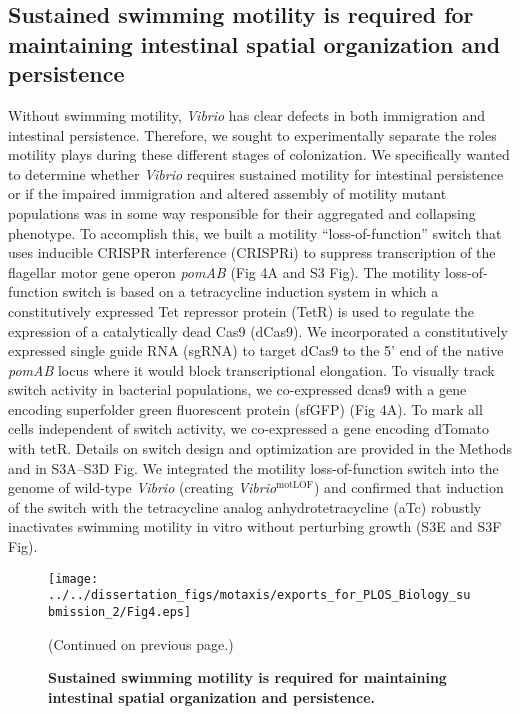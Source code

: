 {{{\subsection{Sustained swimming motility is required for maintaining intestinal spatial organization and persistence}  
Without swimming motility, \textit{Vibrio} has clear defects in both immigration and intestinal persistence. Therefore, we sought to experimentally separate the roles motility plays during these different stages of colonization. We specifically wanted to determine whether \textit{Vibrio} requires sustained motility for intestinal persistence or if the impaired immigration and altered assembly of motility mutant populations was in some way responsible for their aggregated and collapsing phenotype. To accomplish this, we built a motility ``loss-of-function'' switch that uses inducible CRISPR interference (CRISPRi) to suppress transcription of the flagellar motor gene operon \textit{pomAB} (Fig 4A and S3 Fig). The motility loss-of-function switch is based on a tetracycline induction system in which a constitutively expressed Tet repressor protein (TetR) is used to regulate the expression of a catalytically dead Cas9 (dCas9). We incorporated a constitutively expressed single guide RNA (sgRNA) to target dCas9 to the 5' end of the native \textit{pomAB} locus where it would block transcriptional elongation. To visually track switch activity in bacterial populations, we co-expressed dcas9 with a gene encoding superfolder green fluorescent protein (sfGFP) (Fig 4A). To mark all cells independent of switch activity, we co-expressed a gene encoding dTomato with tetR. Details on switch design and optimization are provided in the Methods and in S3A–S3D Fig. We integrated the motility loss-of-function switch into the genome of wild-type \textit{Vibrio} (creating \textit{Vibrio}$^{\text{motLOF}}$) and confirmed that induction of the switch with the tetracycline analog anhydrotetracycline (aTc) robustly inactivates swimming motility in vitro without perturbing growth (S3E and S3F Fig).  

\begin{figure}%
	\centerline{
		\texttt{[image: ../../dissertation\_figs/motaxis/exports\_for\_PLOS\_Biology\_submission\_2/Fig4.eps]}}
	\caption{\textbf{Sustained swimming motility is required for maintaining intestinal spatial organization and persistence.}}{(Continued on previous page.)}
	\label{fig:motaxis_fig4}
\end{figure}

}}}
